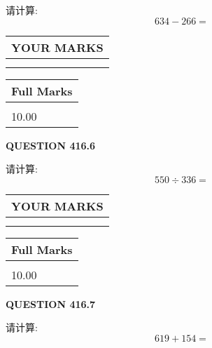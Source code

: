 \documentclass{ctexart}
\begin{document}
  
 
请计算:
\begin{equation}
634 -   %
266 = \nonumber
\end{equation}
 

 

 
  
\vspace{0.2in}
  
\noindent\begin{tabular}{|l|}
\hline
 YOUR MARKS  \\
\hline
 \\ 
 \\ 
\hline
\end{tabular}
\hspace{0.05in} \begin{tabular}{|l|}
\hline
 Full Marks  \\
\hline
 \\ 
10.00 \\
\hline
\end{tabular}
{\textbf{\Large{QUESTION
416.6 
}}}
  
  
 
请计算:
\begin{equation}
550  \div    %
336 = \nonumber
\end{equation}
 

 

 
  
\vspace{0.2in}
  
\noindent\begin{tabular}{|l|}
\hline
 YOUR MARKS  \\
\hline
 \\ 
 \\ 
\hline
\end{tabular}
\hspace{0.05in} \begin{tabular}{|l|}
\hline
 Full Marks  \\
\hline
 \\ 
10.00 \\
\hline
\end{tabular}
{\textbf{\Large{QUESTION
416.7 
}}}
  
  
 
请计算:
\begin{equation}
619 +  %
154 = \nonumber
\end{equation}
 

 

 
  
\vspace{0.2in}
  
\end{document}
